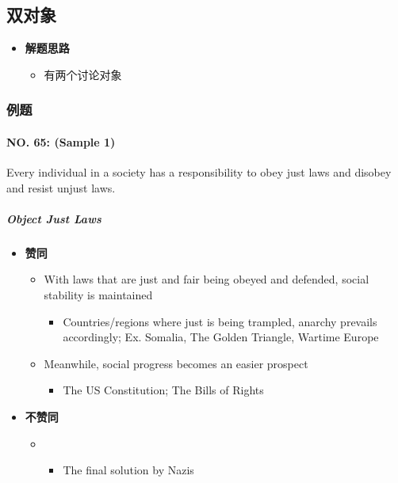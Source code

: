 \subsection{双对象}

\begin{itemize}
  \item \textbf{解题思路}
  \begin{itemize}
    \item 有两个讨论对象
  \end{itemize}
\end{itemize}

\subsubsection{例题}

  \paragraph{NO. 65: (Sample 1)}
  Every individual in a society has a responsibility to obey just laws
  and disobey and resist unjust laws.

  \subparagraph{Object Just Laws}

  \begin{itemize}
    \item \textbf{赞同}
    \begin{itemize}
      \item With laws that are just and fair being obeyed and defended,
      social stability is maintained
      \begin{itemize}
        \item Countries/regions where just is being trampled, anarchy
        prevails accordingly; Ex. Somalia, The Golden Triangle,
        Wartime Europe
      \end{itemize}

      \item Meanwhile, social progress becomes an easier prospect
      \begin{itemize}
        \item The US Constitution; The Bills of Rights
      \end{itemize}
    \end{itemize}

    \item \textbf{不赞同}
    \begin{itemize}
      \item {}
      \begin{itemize}
        \item The final solution by Nazis
      \end{itemize}
    \end{itemize}
  \end{itemize}


